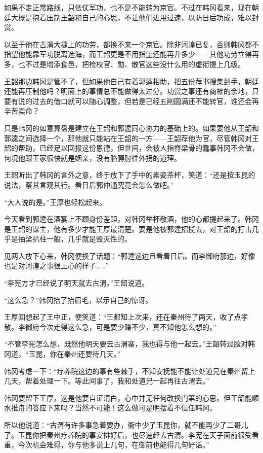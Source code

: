 如果不走正常路线，只依仗军功，也不是不能转为京官。不过在韩冈看来，现在朝廷大概是抱着压制王韶和自己的心思，不让他们进用过速，以防日后功成，难以封赏。

以至于他在古渭大捷上的功劳，都换不来一个京官。除非河湟已复，否则韩冈都不指望他能靠军功脱离选海，而王韶更是不用指望还能再升多少——其他功劳立得再多，也不过是增添食邑，把检校官、勋、散官这些没什么用的虚衔提上几级。

王韶那边韩冈是管不了，但如果他自己有着郭逵相助，把五份荐书搜集到手，朝廷还能再压制他吗？明面上的事情总不能做得太过分。功赏之事还有商榷的余地，只要有说的过去的借口就可以随心调整，但若是已经五削圆满还不能转官，谁还会再辛苦卖命？

只是韩冈的如意算盘是建立在王韶和郭逵同心协力的基础上的。如果要他从王韶和郭逵之间选择一个，那他就只能站在王韶的一方——王韶荐他为官，尽管韩冈对王韶的帮助，已经足以回报这份恩德，但世间，会被人指脊梁骨的蠢事韩冈不会做，何况他跟王家很快就是姻亲，没有胳膊肘往外拐的道理。

王韶听出了韩冈的言外之意，终于放下了手中的素瓷茶杯，笑道：“还是按玉昆的说法，察其言观其行。看日后郭仲通究竟会怎么做吧。”

“大人说的是。”王厚也轻松起来。

今天看到郭逵在酒宴上不顾身份差距，对韩冈举杯敬酒，他的心都提起来了。韩冈是王韶的谋主，他有多少才能王厚最清楚。要是他被郭逵招揽去，对王韶的打击几乎是抽梁扒柱一般，几乎就是毁灭性的。

见两人放下心来，韩冈便换了话题：“郭逵这边且看着日后。而李御府那边，好像也是对河湟之事很上心的样子……”

“李宪方才已经说了明天就去古渭。”王韶说道。

“这么急？”韩冈抬了抬眉毛，以示自己的惊讶。

王厚回想起了王中正，便笑道：“王都知上次来，还在秦州待了两天，收了点孝敬。李御府今次走得这么急，可是要少赚不少，真不知他怎么想的。”

“不管李宪怎么想，既然他明天要去古渭寨，我也得与他一起去。”王韶转过脸对韩冈道，“玉昆，你在秦州还要待几天。”

韩冈考虑一下：“疗养院这边的事有些棘手，不知安抚能不能让处道兄在秦州留上几天，帮着处理一下。等此间事了，我和处道兄一起再往古渭去。”

韩冈要留下王厚，这是他要自证清白，心中并无任何改换门第的心思。但王韶能顺水推舟的答应下来吗？当然不可能！这么做可是明摆着不信任韩冈。

所以他说道：“古渭有许多事急着要办，衙中少了玉昆你，就不能再少了二哥儿了。玉昆你把秦州疗养院的事安排好后，也尽速赶去古渭。李宪在天子面前很受看重，今次机会难得，你与他多说上几句，在御前也能得几句好话。”


